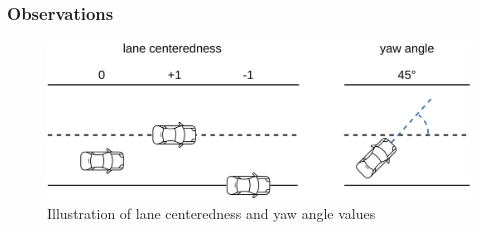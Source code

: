 \noindent 

\subsubsection{Observations}
\label{sec:observations}

\begin{figure}[htbp]
    \includegraphics[width=0.8\linewidth]{figures/angle_distance.pdf}
    \centering
    \caption{Illustration of lane centeredness and yaw angle values}
    \label{fig:observations}
\end{figure}


